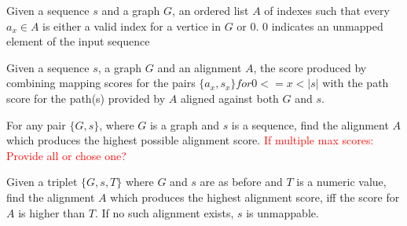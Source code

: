 \documentclass{article}
\begin{document}
\begin{defn}[Alignment]
  Given a sequence $s$ and a graph $G$, an ordered list $A$ of indexes such that every $a_x \in A$ is either a valid index for a vertice in $G$ or $0$. $0$ indicates an unmapped element of the input sequence
\end{defn}
\begin{defn}
  Given a sequence $s$, a graph $G$ and an alignment $A$, the score produced by combining mapping scores for the pairs $\{a_x, s_x\} for 0<=x<|s|$ with the path score for the path(s) provided by $A$ aligned against both $G$ and $s$.
\end{defn}
\begin{defn}
  For any pair $\{G, s\}$, where $G$ is a graph and $s$ is a sequence, find the alignment $A$ which produces the highest possible alignment score.
  \textcolor{red}{If multiple max scores: Provide all or chose one?}
\end{defn}
\begin{defn}
  Given a triplet $\{G, s, T\}$ where $G$ and $s$ are as before and $T$ is a numeric value, find the alignment $A$ which produces the highest alignment score, iff the score for $A$ is higher than $T$. If no such alignment exists, $s$ is unmappable.
\end{defn}
\end{document}
